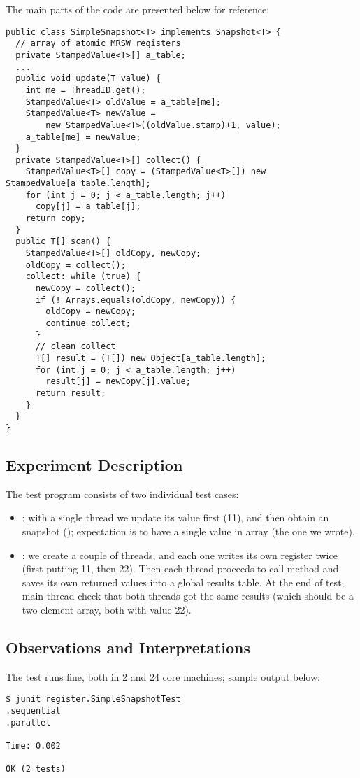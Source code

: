 The main parts of the code are presented below for reference: \\

\begin{lstlisting}[style=numbers]
public class SimpleSnapshot<T> implements Snapshot<T> {
  // array of atomic MRSW registers
  private StampedValue<T>[] a_table;  
  ...
  public void update(T value) {
    int me = ThreadID.get();
    StampedValue<T> oldValue = a_table[me];
    StampedValue<T> newValue =
        new StampedValue<T>((oldValue.stamp)+1, value);
    a_table[me] = newValue;
  }
  private StampedValue<T>[] collect() {
    StampedValue<T>[] copy = (StampedValue<T>[]) new StampedValue[a_table.length];
    for (int j = 0; j < a_table.length; j++)
      copy[j] = a_table[j];
    return copy;
  }
  public T[] scan() {
    StampedValue<T>[] oldCopy, newCopy;
    oldCopy = collect();
    collect: while (true) {
      newCopy = collect();
      if (! Arrays.equals(oldCopy, newCopy)) {
        oldCopy = newCopy;
        continue collect;
      }
      // clean collect
      T[] result = (T[]) new Object[a_table.length];
      for (int j = 0; j < a_table.length; j++)
        result[j] = newCopy[j].value;
      return result;
    }
  }
}
\end{lstlisting}
\hfill

\subsection{Experiment Description}

The test program  consists of two individual
test cases: 

\begin{itemize}
  \item {}: with a single thread we update its value
    first (11), and then obtain an snapshot (); expectation is
    to have a single value in array (the one we wrote).
  \item {}: we create a couple of threads, and each one
    writes its own register twice (first putting 11, then 22). Then
    each thread proceeds to call  method and saves its own
    returned values into a global results table. At the end of test,
    main thread check that both threads got the same results (which
    should be a two element array, both with value 22). 
\end{itemize}

\subsection{Observations and Interpretations}
The test runs fine, both in 2 and 24 core machines; sample output
below: \\

\begin{verbatim}
$ junit register.SimpleSnapshotTest
.sequential
.parallel

Time: 0.002

OK (2 tests)
\end{verbatim}
\hfill


